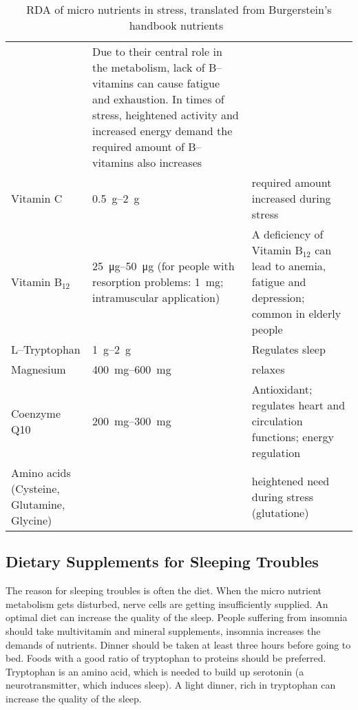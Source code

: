 \documentclass[../main.tex]{subfiles}
\begin{document}
\begin{table}[htb!]
\begin{tabular}{p{2.2cm}p{4cm}p{5.2cm}}
                                      & Due to their central role in the metabolism, lack of B--vitamins can cause fatigue and exhaustion.
                                        In times of stress, heightened  activity and increased energy demand the required amount of B--vitamins also increases \\
      Vitamin C\index{vitamin!C} & \SIrange{0.5}{2}{\gram} & required amount increased during stress \\
      Vitamin B$_{12}$\index{vitamin!B12} & \SIrange{25}{50}{\micro\gram} (for people with resorption problems: \SI{1}{\milli\gram}; intramuscular application)
                                      & A deficiency of Vitamin B$_{12}$ can lead to anemia, fatigue and depression; common in elderly people \\
      L--Tryp\-to\-phan\index{micro nutrient!L--tryptophan} & \SIrange{1}{2}{\gram} & Regulates sleep \\
      Magnesium\index{mineral!magnesium} & \SIrange{400}{600}{\milli\gram} & relaxes \\
      Coenzyme Q10\index{micro nutrient!Coenzyme Q10} & \SIrange{200}{300}{\milli\gram} & Antioxidant; regulates heart and circulation functions; energy regulation \\
      Amino acids (Cys\-teine\index{micro nutrient!cysteine}, Glut\-amine\index{micro nutrient!glutamine}, Gly\-cine\index{micro nutrient!glycine})
                        & & heightened need during stress (glutatione) \\
    \end{tabular}
    \caption[RDA of micro nutrients in stress]{RDA of micro nutrients in stress, translated from  Burgerstein's handbook nutrients~\cite{BurgerNutrient}}
  \end{table}

  \subsection{Dietary Supplements for Sleeping Troubles}
  The reason for sleeping troubles is often the diet.
When the micro nutrient metabolism gets disturbed, nerve cells are getting insufficiently supplied.
An optimal diet can increase the quality of the sleep.
People suffering from insomnia should take multivitamin and mineral supplements,
insomnia increases the demands of nutrients.
Dinner should be taken at least three hours before going to bed.
Foods with a good ratio of tryptophan to proteins should be preferred.
Tryptophan is an amino acid, which is needed to build up serotonin
(a neurotransmitter, which  induces sleep).
A light dinner, rich in tryptophan can increase the quality of the sleep.
\end{document}
